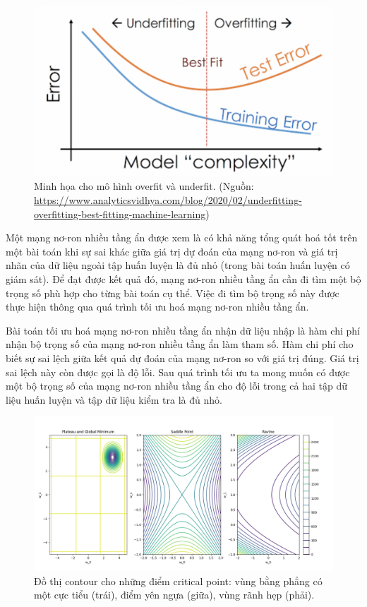 \begin{figure}[htp]
	\centering
	\includegraphics[width=100 mm]{images/under-over.png}
	\caption{Minh họa cho mô hình overfit và underfit. (Nguồn: \url{https://www.analyticsvidhya.com/blog/2020/02/underfitting-overfitting-best-fitting-machine-learning})}
	\label{fig:under-over}
\end{figure}

Một mạng nơ-ron nhiều tầng ẩn được xem là có khả năng tổng quát hoá tốt trên một bài toán khi sự sai khác giữa giá trị dự đoán của mạng nơ-ron và giá trị nhãn của dữ liệu ngoài tập huấn luyện là đủ nhỏ (trong bài toán huấn luyện có giám sát). Để đạt được kết quả đó, mạng nơ-ron nhiều tầng ẩn cần đi tìm một bộ trọng số phù hợp cho từng bài toán cụ thể. Việc đi tìm bộ trọng số này được thực hiện thông qua quá trình tối ưu hoá mạng nơ-ron nhiều tầng ẩn.

Bài toán tối ưu hoá mạng nơ-ron nhiều tầng ẩn nhận dữ liệu nhập là hàm chi phí nhận bộ trọng số của mạng nơ-ron nhiều tầng ẩn làm tham số. Hàm chi phí cho biết sự sai lệch giữa kết quả dự đoán của mạng nơ-ron so với giá trị đúng. Giá trị sai lệch này còn được gọi là độ lỗi. Sau quá trình tối ưu ta mong muốn có được một bộ trọng số của mạng nơ-ron nhiều tầng ẩn cho độ lỗi trong cả hai tập dữ liệu huấn luyện và tập dữ liệu kiểm tra là đủ nhỏ.

\begin{figure}[htp]
	\centering
	\includegraphics[width=120 mm]{images/cricial-point-contour.png}
	\caption{Đồ thị contour cho những điểm critical point: vùng bằng phẳng có một cực tiểu (trái), điểm yên ngựa (giữa), vùng rãnh hẹp (phải).}
	\label{fig:cricial-point-contour}
\end{figure}

